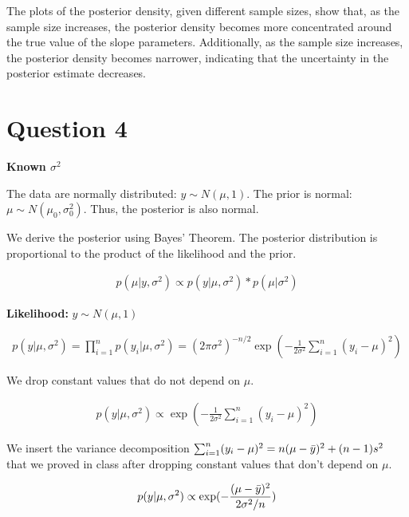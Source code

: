 \documentclass{article}
\begin{document}
The plots of the posterior density, given different sample sizes, show
that, as the sample size increases, the posterior density becomes more
concentrated around the true value of the slope parameters.
Additionally, as the sample size increases, the posterior density
becomes narrower, indicating that the uncertainty in the posterior
estimate decreases.

\section{Question 4}
\vspace{2em}


\begin{center}
\textbf{Known $\sigma^{2}$}
\end{center}
\vspace{2em}


The data are normally distributed: $y\sim N(\mu,1)$.
The prior is normal: $\mu \sim N(\mu_{0},\sigma_{0}^{2})$. Thus, the posterior is also normal.

We derive the posterior using Bayes' Theorem. The posterior distribution is proportional to the product of the likelihood and the prior. 

\begin{align*}
 p(\mu|y,\sigma^{2}) \propto p(y|\mu,\sigma^{2})*p(\mu|\sigma^{2})
\end{align*}   
\newpage

\textbf{Likelihood:} $y\sim N(\mu,1)$

\begin{align*}
    p(y|\mu,\sigma^{2})=\prod_{i=1}^{n}p(y_{i}|\mu,\sigma^{2})=(2\pi\sigma^{2})^{-n/2}\exp(-\frac{1}{2\sigma^{2}}\sum_{i=1}^{n}(y_{i}-\mu)^{2})
\end{align*}

We drop constant values that do not depend on $\mu$.

\begin{align*}
    p(y|\mu,\sigma^{2}) \propto \exp(-\frac{1}{2\sigma^{2}}\sum_{i=1}^{n}(y_{i}-\mu)^{2})
\end{align*}

We insert the variance decomposition $\sum_{i=1}^{n}(y_{i}-\mu)^{2}=n(\mu-\Bar{y})^{2}+(n-1)s^{2}$ that we proved in class after dropping constant values that don't depend on $\mu$.

\begin{align*}
    p(y|\mu,\sigma^{2}) \propto \exp(-\frac{(\mu-\Bar{y})^{2}}{2\sigma^{2}/n})
\end{align*}
\end{document}
